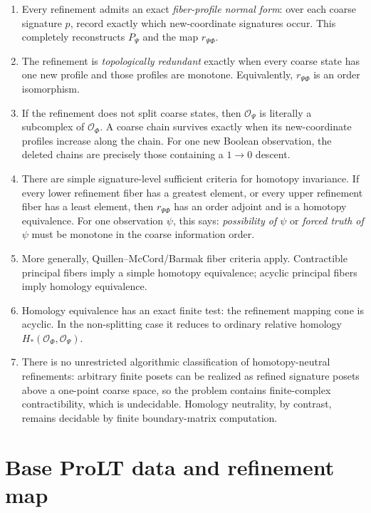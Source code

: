 \documentclass[11pt]{article}
\theoremstyle{definition}
\newcommand{\OX}{\mathcal O}
\begin{document}
\begin{enumerate}[label=\textbf{R\arabic*.},leftmargin=2.7em]
\item Every refinement admits an exact \emph{fiber-profile normal form}: over each coarse signature \(p\), record exactly which new-coordinate signatures occur. This completely reconstructs \(P_\Psi\) and the map \(r_{\Psi\Phi}\).
\item The refinement is \emph{topologically redundant} exactly when every coarse state has one new profile and those profiles are monotone. Equivalently, \(r_{\Psi\Phi}\) is an order isomorphism.
\item If the refinement does not split coarse states, then \(\OX_\Psi\) is literally a subcomplex of \(\OX_\Phi\). A coarse chain survives exactly when its new-coordinate profiles increase along the chain. For one new Boolean observation, the deleted chains are precisely those containing a \(1\to0\) descent.
\item There are simple signature-level sufficient criteria for homotopy invariance. If every lower refinement fiber has a greatest element, or every upper refinement fiber has a least element, then \(r_{\Psi\Phi}\) has an order adjoint and is a homotopy equivalence. For one observation \(\psi\), this says: \emph{possibility of \(\psi\)} or \emph{forced truth of \(\psi\)} must be monotone in the coarse information order.
\item More generally, Quillen--McCord/Barmak fiber criteria apply. Contractible principal fibers imply a simple homotopy equivalence; acyclic principal fibers imply homology equivalence.
\item Homology equivalence has an exact finite test: the refinement mapping cone is acyclic. In the non-splitting case it reduces to ordinary relative homology \(H_*(\OX_\Phi,\OX_\Psi)\).
\item There is no unrestricted algorithmic classification of homotopy-neutral refinements: arbitrary finite posets can be realized as refined signature posets above a one-point coarse space, so the problem contains finite-complex contractibility, which is undecidable. Homology neutrality, by contrast, remains decidable by finite boundary-matrix computation.
\end{enumerate}

\section{Base ProLT data and refinement map}
\end{document}
